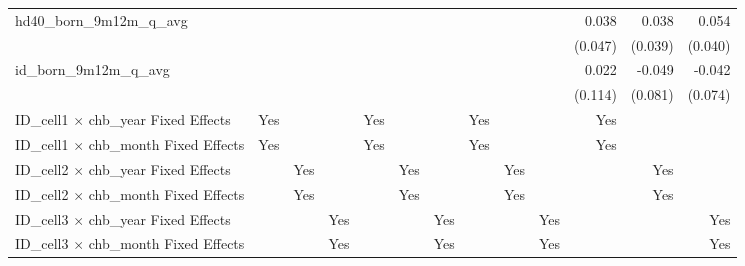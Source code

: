 \begin{tabular}{lrrrrrrrrrrrr}
hd40\_born\_9m12m\_q\_avg                   &              &              &              &              &              &              &              &              &              &        0.038 &        0.038 &        0.054 \\ 
                                            &              &              &              &              &              &              &              &              &              &      (0.047) &      (0.039) &      (0.040) \\ 
id\_born\_9m12m\_q\_avg                     &              &              &              &              &              &              &              &              &              &        0.022 &       -0.049 &       -0.042 \\ 
                                            &              &              &              &              &              &              &              &              &              &      (0.114) &      (0.081) &      (0.074) \\ 
\midrule
ID\_cell1 $\times$ chb\_year Fixed Effects  &          Yes &              &              &          Yes &              &              &          Yes &              &              &          Yes &              &              \\ 
ID\_cell1 $\times$ chb\_month Fixed Effects &          Yes &              &              &          Yes &              &              &          Yes &              &              &          Yes &              &              \\ 
ID\_cell2 $\times$ chb\_year Fixed Effects  &              &          Yes &              &              &          Yes &              &              &          Yes &              &              &          Yes &              \\ 
ID\_cell2 $\times$ chb\_month Fixed Effects &              &          Yes &              &              &          Yes &              &              &          Yes &              &              &          Yes &              \\ 
ID\_cell3 $\times$ chb\_year Fixed Effects  &              &              &          Yes &              &              &          Yes &              &              &          Yes &              &              &          Yes \\ 
ID\_cell3 $\times$ chb\_month Fixed Effects &              &              &          Yes &              &              &          Yes &              &              &          Yes &              &              &          Yes \\ 

\end{tabular}
